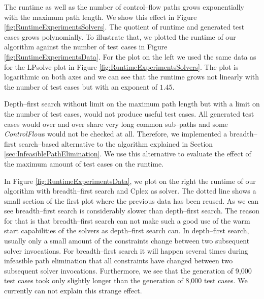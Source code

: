 \documentclass[runningheads,a4paper]{llncs}%
\newcommand{\UMLType}[1]{\textsf{\textit{#1}}} %
\begin{document}
The runtime as well as the number of control--flow paths grows exponentially with the maximum path length. We show this effect in Figure \ref{fig:RuntimeExperimentsSolvers}. The quotient of runtime and generated test cases grows polynomially. 
To illustrate that, we plotted the runtime of our algorithm against the number of test cases in Figure \ref{fig:RuntimeExperimentsData}. For the plot on the left we used the same data as for the LPsolve plot in Figure \ref{fig:RuntimeExperimentsSolvers}. The plot is logarithmic on both axes and we can see that the runtime grows not linearly with the number of test cases but with an exponent of $1.45$.

Depth--first search without limit on the maximum path length but with a limit on the number of test cases, would not produce useful test cases. All generated test cases would over and over share very long common sub--paths and some \UMLType{ControlFlow}s would not be checked at all. Therefore, 
we implemented a breadth--first search--based alternative to the algorithm explained in Section \ref{sec:InfeasiblePathElimination}. We use this alternative to evaluate the effect of the maximum amount of test cases on the runtime.

In Figure \ref{fig:RuntimeExperimentsData}, we plot on the right the runtime of our algorithm with breadth--first search and Cplex as solver. The dotted line shows a small section of the first plot where the previous data has been reused. As we can see breadth--first search is considerably slower than depth--first search. The reason for that is that breadth--first search can not make such a good use of the warm start capabilities of the solvers as depth--first search can. In depth--first search, usually only a small amount of the constraints change between two subsequent solver invocations. For breadth--first search it will happen several times during infeasible path elimination that all constraints have changed between two subsequent solver invocations. Furthermore, we see that the generation of 9,000 test cases took only slightly longer than the generation of 8,000 test cases. We currently can not explain this strange effect.
\end{document}
